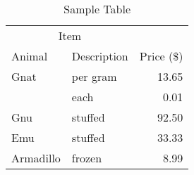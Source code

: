 \begin{table}[htbp]
	\centering
	\caption{Sample Table}
	\label{tab:sample}
	\begin{tabular}{@{}llr@{}} \toprule
		\multicolumn{2}{c}{Item} \\ \cmidrule(r){1-2}
		Animal & Description & Price (\$)\\ \midrule
		Gnat & per gram & 13.65 \\
		& each & 0.01 \\
		Gnu & stuffed & 92.50 \\
		Emu & stuffed & 33.33 \\
		Armadillo & frozen & 8.99 \\ \bottomrule
		\end{tabular} 
\end{table}
